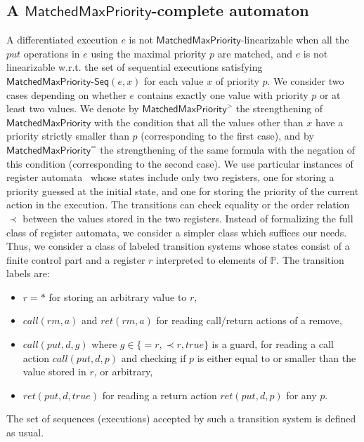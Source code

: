 \documentclass[a4paper,UKenglish]{lipics-v2016}
\begin{document}
\subsection{A $\mathsf{MatchedMaxPriority}$-complete automaton}\label{ssec:aut}


A differentiated execution $e$ is not $\mathsf{MatchedMaxPriority}$-linearizable when all the $\textit{put}$ operations in $e$ using the maximal priority $p$ are matched, and $e$ is not linearizable w.r.t. the set of sequential executions satisfying $\mathsf{MatchedMaxPriority\text{-}Seq}(e,x)$ for each value $x$ of priority $p$. We consider two cases depending on whether $e$ contains exactly one value with priority $p$ or at least two values. We denote by $\mathsf{MatchedMaxPriority}^{>}$ the strengthening of $\mathsf{MatchedMaxPriority}$ with the condition that all the values other than $x$ have a priority strictly smaller than $p$ (corresponding to the first case), and by $\mathsf{MatchedMaxPriority}^{=}$ the strengthening of the same formula with the negation of this condition (corresponding to the second case).
We use particular instances of register automata~\cite{DBLP:journals/tcs/KaminskiF94,DBLP:conf/icalp/Cerans94,DBLP:conf/stacs/SegoufinT11} whose states include only two registers, one for storing a priority guessed at the initial state, and one for storing the priority of the current action in the execution. The transitions can check equality or the order relation $\prec$ between the values stored in the two registers. Instead of formalizing the full class of register automata, we consider a simpler class which suffices our needs. Thus, we consider a class of labeled transition systems whose states consist of a finite control part and a register $r$ interpreted to elements of $\mathbb{P}$. The transition labels are:
\begin{itemize}
	\item $r=*$ for storing an arbitrary value to $r$,
	\item $\textit{call}(\textit{rm},a)$ and $\textit{ret}(\textit{rm},a)$ for reading call/return actions of a remove,
	\item $\textit{call}(\textit{put},d,g)$ where $g\in\{=r,\prec r,true\}$ is a guard, for reading a call action $\textit{call}(\textit{put},d,p)$ and checking if $p$ is either equal to or smaller than the value stored in $r$, or arbitrary,
	\item $\textit{ret}(\textit{put},d,true)$ for reading a return action $\textit{ret}(\textit{put},d,p)$ for any $p$.
\end{itemize}
The set of sequences (executions) accepted by such a transition system is defined as usual.
\end{document}
